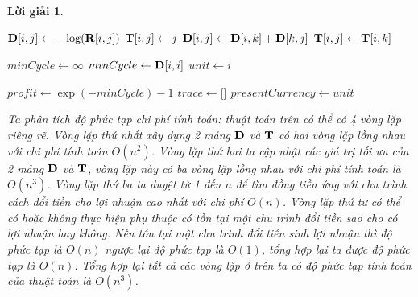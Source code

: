 \documentclass[14pt, a4paper]{article}
\theoremstyle{sltheorem}
\theoremstyle{soltheorem}
\newtheorem*{loigiai}{Lời giải}
\begin{document}
\begin{loigiai}
        \begin{algorithm}[h!]
            \DontPrintSemicolon

             {
                 {
                    $\bold{D} \lbrack i, j \rbrack \gets -\log (\bold{R} \lbrack i, j \rbrack)$\;
                    $\bold{T} \lbrack i, j \rbrack \gets j$\;
                }
            }
             {
                 {
                     {
                         {
                            $\bold{D} \lbrack i, j \rbrack \gets \bold{D} \lbrack i, k \rbrack + \bold{D} \lbrack k, j \rbrack$\;
                            $\bold{T} \lbrack i, j \rbrack \gets \bold{T} \lbrack i, k \rbrack$
                        }
                    }
                }
            }

            $minCycle \gets \infty$\;
             {
                 {
                    $minCycle \gets \bold{D} \lbrack i, i \rbrack$\;
                    $unit \gets i$\;
                }
            }

             {
                $profit \gets \exp(-minCycle) - 1$\;
                $trace \gets \lbrack \rbrack$\;
                $presentCurrency \gets unit$\;
                \;
            } 
            \caption{Thuật toán tìm cách đổi tiền sinh ra lợi nhuận tốt nhất}
            \label{alg:currency-exchange}
        \end{algorithm}

        Ta phân tích độ phức tạp chi phí tính toán: thuật toán trên có thể có 4 vòng lặp riêng rẽ.
        Vòng lặp thứ nhất xây dựng 2 mảng $\bold{D}$ và $\bold{T}$ có hai vòng lặp lồng nhau với chi phí tính toán $O(n^2)$.
        Vòng lặp thứ hai ta cập nhật các giá trị tối ưu của 2 mảng $\bold{D}$ và $\bold{T}$, vòng lặp này có ba vòng lặp lồng nhau với chi phí tính toán là $O(n^3)$.
        Vòng lặp thứ ba ta duyệt từ 1 đến $n$ để tìm đồng tiền ứng với chu trình cách đổi tiền cho lợi nhuận cao nhất với chi phí $O(n)$.
        Vòng lặp thứ tư có thể có hoặc không thực hiện phụ thuộc có tồn tại một chu trình đổi tiền sao cho có lợi nhuận hay không.
        Nếu tồn tại một chu trình đổi tiền sinh lợi nhuận thì độ phức tạp là $O(n)$ ngược lại độ phức tạp là $O(1)$, tổng hợp lại ta được độ phức tạp là $O(n)$.
        Tổng hợp lại tất cả các vòng lặp ở trên ta có độ phức tạp tính toán của thuật toán là $O(n^3)$.


\end{loigiai}
\end{document}
